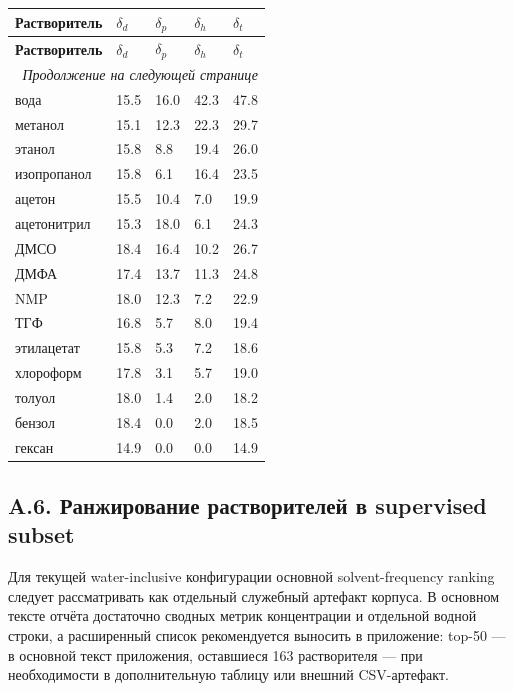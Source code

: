 \documentclass[11pt]{article}
\begin{document}
\begin{center}
\small
\begin{longtable}{|p{3.6cm}|p{1.8cm}|p{1.8cm}|p{1.8cm}|p{1.8cm}|}
\hline
\textbf{Растворитель} & \textbf{$\delta_d$} & \textbf{$\delta_p$} & \textbf{$\delta_h$} & \textbf{$\delta_t$} \\
\hline
\endfirsthead
\hline
\textbf{Растворитель} & \textbf{$\delta_d$} & \textbf{$\delta_p$} & \textbf{$\delta_h$} & \textbf{$\delta_t$} \\
\hline
\endhead
\hline
\multicolumn{5}{r}{\textit{Продолжение на следующей странице}} \\
\hline
\endfoot
\hline
\endlastfoot
вода & 15.5 & 16.0 & 42.3 & 47.8 \\
\hline
метанол & 15.1 & 12.3 & 22.3 & 29.7 \\
\hline
этанол & 15.8 & 8.8 & 19.4 & 26.0 \\
\hline
изопропанол & 15.8 & 6.1 & 16.4 & 23.5 \\
\hline
ацетон & 15.5 & 10.4 & 7.0 & 19.9 \\
\hline
ацетонитрил & 15.3 & 18.0 & 6.1 & 24.3 \\
\hline
ДМСО & 18.4 & 16.4 & 10.2 & 26.7 \\
\hline
ДМФА & 17.4 & 13.7 & 11.3 & 24.8 \\
\hline
NMP & 18.0 & 12.3 & 7.2 & 22.9 \\
\hline
ТГФ & 16.8 & 5.7 & 8.0 & 19.4 \\
\hline
этилацетат & 15.8 & 5.3 & 7.2 & 18.6 \\
\hline
хлороформ & 17.8 & 3.1 & 5.7 & 19.0 \\
\hline
толуол & 18.0 & 1.4 & 2.0 & 18.2 \\
\hline
бензол & 18.4 & 0.0 & 2.0 & 18.5 \\
\hline
гексан & 14.9 & 0.0 & 0.0 & 14.9 \\
\hline
\end{longtable}
\normalsize
\end{center}

\subsection*{A.6. Ранжирование растворителей в supervised subset}

Для текущей water-inclusive конфигурации основной solvent-frequency ranking следует рассматривать как отдельный служебный артефакт корпуса. В основном тексте отчёта достаточно сводных метрик концентрации и отдельной водной строки, а расширенный список рекомендуется выносить в приложение: top-50 --- в основной текст приложения, оставшиеся 163 растворителя --- при необходимости в дополнительную таблицу или внешний CSV-артефакт.
\end{document}
